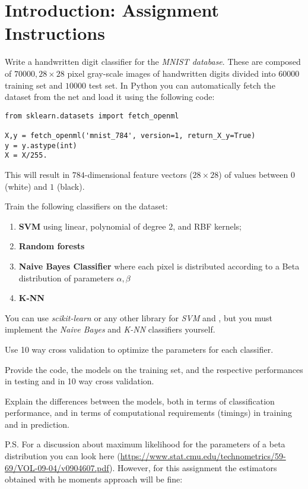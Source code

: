 
\chapter{Introduction: Assignment Instructions}

Write a handwritten digit classifier for the \textit{MNIST database}. These are composed of $70000, 28 \times 28$ pixel gray-scale images of handwritten digits divided into $60000$ training set and $10000$ test set.
In Python you can automatically fetch the dataset from the net and load it using the following code:

\begin{lstlisting}
from sklearn.datasets import fetch_openml

X,y = fetch_openml('mnist_784', version=1, return_X_y=True)
y = y.astype(int)
X = X/255.
\end{lstlisting}

This will result in $784$-dimensional feature vectors ($28 \times 28$) of values between $0$ (white) and $1$ (black).

Train the following classifiers on the dataset:

\begin{enumerate}
    \item \textbf{SVM}  using linear, polynomial of degree 2, and RBF kernels;
    \item \textbf{Random forests}
    \item \textbf{Naive Bayes Classifier} where each pixel is distributed according to a Beta distribution of parameters $\alpha, \beta$
    \item \textbf{K-NN}
\end{enumerate}

You can use \textit{scikit-learn} or any other library for \textit{SVM} and , but you must implement the \textit{Naive Bayes} and \textit{K-NN} classifiers yourself.

Use 10 way cross validation to optimize the parameters for each classifier.

Provide the code, the models on the training set, and the respective performances in testing and in 10 way cross validation.

Explain the differences between the models, both in terms of classification performance, and in terms of computational requirements (timings) in training and in prediction.

P.S. For a discussion about maximum likelihood for the parameters of a beta distribution you can look here (\url{https://www.stat.cmu.edu/technometrics/59-69/VOL-09-04/v0904607.pdf}). However, for this assignment the estimators obtained with he moments approach will be fine:

